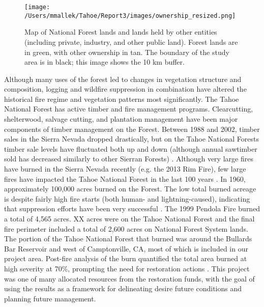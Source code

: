 \begin{figure}[!htbp]
\centering
\texttt{[image: /Users/mmallek/Tahoe/Report3/images/ownership\_resized.png]}
\caption{Map of National Forest lands and lands held by other entities (including private, industry, and other public land). Forest lands are in green, with other ownership in tan. The boundary of the study area is in black; this image shows the 10 km buffer.} 
\label{ownership}
\end{figure}

Although many uses of the forest led to changes in vegetation structure and composition, logging and wildfire suppression in combination have altered the historical fire regime and vegetation patterns most significantly. The Tahoe National Forest has active timber and fire management programs. Clearcutting, shelterwood, salvage cutting, and plantation management have been major components of timber management on the Forest. Between 1988 and 2002, timber sales in the Sierra Nevada dropped drastically, but on the Tahoe National Forests timber sale levels have fluctuated both up and down (although annual sawtimber sold has decreased similarly to other Sierran Forests) \citep{USDAForestService2004}. Although very large fires have burned in the Sierra Nevada recently (e.g. the 2013 Rim Fire), few large fires have impacted the Tahoe National Forest in the last 100 years \citep{USDAForestService1990}. In 1960, approximately 100,000 acres burned on the Forest. The low total burned acreage is despite fairly high fire starts (both human- and lightning-caused), indicating that suppression efforts have been very successful \citep{USDAForestService1990}. The 1999 Pendola Fire burned a total of 4,565 acres. XX acres were on the Tahoe National Forest and the final fire perimeter included a total of 2,600 acres on National Forest System lands. The portion of the Tahoe National Forest that burned was around the Bullards Bar Reservoir and west of Camptonville, CA, most of which is included in our project area. Post-fire analysis of the burn quantified the total area burned at high severity at 70\%, prompting the need for restoration actions \citep{USDAForestService1999,}. This project was one of many allocated resources from the restoration funds, with the goal of using the results as a framework for delineating desire future conditions and planning future management.





